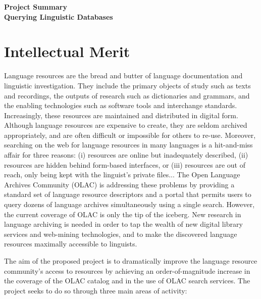 \documentclass[11pt]{nsf}
\begin{document}
\begin{center}\textbf{\Large
Project Summary\\[2ex]
Querying Linguistic Databases
}\end{center}

\section*{Intellectual Merit}

%
%
Language resources are the bread and butter of
language documentation and linguistic investigation.
They include
the primary objects of study such as texts and recordings,
the outputs of research such as dictionaries and grammars,
and the enabling technologies such as software tools and interchange standards.
Increasingly, these resources are maintained and distributed in
digital form.
%
%
Although language resources are expensive to create,
they are seldom archived appropriately,
and are often difficult or impossible for others to re-use.
Moreover, searching on the web for language resources in many languages
is a hit-and-miss affair for three reasons:
(i) resources are online but inadequately described,
(ii) resources are hidden behind form-based interfaces, or
(iii) resources are out of reach, only being kept with the linguist's
private files...
%
%
The Open Language Archives Community (OLAC) is addressing these
problems by providing a standard set of language resource descriptors
and a portal that permits users to query dozens of language archives
simultaneously using a single search.  However, the current coverage
of OLAC is only the tip of the iceberg.  New research in language
archiving is needed in order to tap the wealth of
new digital library services and web-mining technologies, and
to make the discovered language resources maximally accessible to linguists.

%
%
The aim of the proposed project is to dramatically improve the language
resource community's access to resources by achieving an 
order-of-magnitude increase in the coverage of the OLAC catalog
and in the use of OLAC search services.
The project seeks to do so through three main areas of activity:
\end{document}
